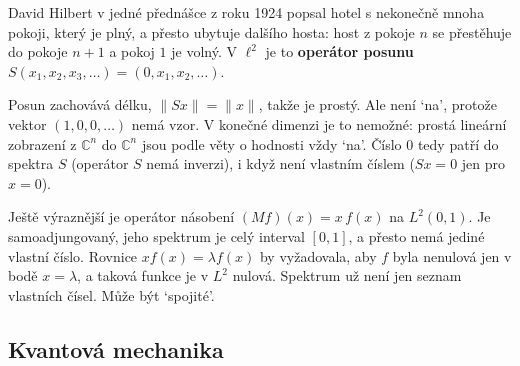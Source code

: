 \begin{example}
  David Hilbert v jedné přednášce z roku 1924 popsal hotel s nekonečně mnoha pokoji, který je plný, a přesto ubytuje dalšího hosta: host z pokoje $n$ se přestěhuje do pokoje $n + 1$ a pokoj $1$ je volný. V $\ell^2$ je to \textbf{operátor posunu} $S(x_1, x_2, x_3, \dots) = (0, x_1, x_2, \dots)$.

  \begin{center}
  \end{center}

  Posun zachovává délku, $\|Sx\| = \|x\|$, takže je prostý. Ale není `na', protože vektor $(1, 0, 0, \dots)$ nemá vzor. V konečné dimenzi je to nemožné: prostá lineární zobrazení z $\mathbb{C}^n$ do $\mathbb{C}^n$ jsou podle věty o hodnosti vždy `na'. Číslo $0$ tedy patří do spektra $S$ (operátor $S$ nemá inverzi), i když není vlastním číslem ($Sx = 0$ jen pro $x = 0$).
\end{example}

Ještě výraznější je operátor násobení $(Mf)(x) = x\,f(x)$ na $L^2(0, 1)$. Je samoadjungovaný, jeho spektrum je celý interval $[0, 1]$, a přesto nemá jediné vlastní číslo. Rovnice $xf(x) = \lambda f(x)$ by vyžadovala, aby $f$ byla nenulová jen v bodě $x = \lambda$, a taková funkce je v $L^2$ nulová. Spektrum už není jen seznam vlastních čísel. Může být `spojité'.

\subsection{Kvantová mechanika}

